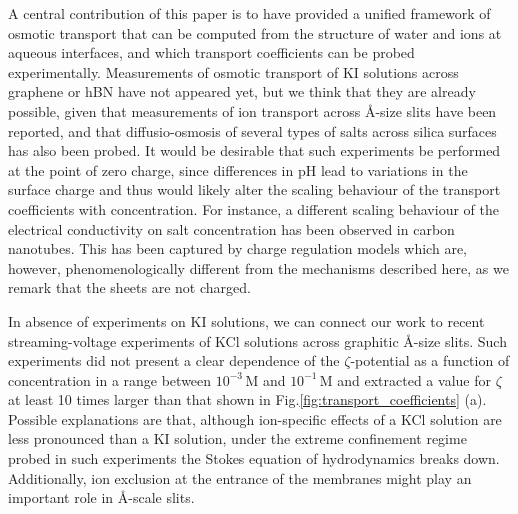\documentclass[journal=ancac3,manuscript=article,layout=twocolumn]{achemso}
\begin{document}
A central contribution of this paper is to have provided
a unified framework of osmotic transport that can be computed
from the structure of water and ions at aqueous interfaces,
and which transport coefficients can be probed experimentally. Measurements of osmotic transport of KI
solutions across graphene or hBN have not appeared yet, but
we think that they are already possible,
given that measurements of ion transport across
{\AA}-size slits have been reported,
and that diffusio-osmosis of several types of salts across
silica surfaces has also been probed.
It would be desirable that such experiments
be performed at the point of zero charge,
since differences in pH lead
to variations in the surface charge\cite{secchi2016scaling,Grosjean2019,Siria2013,Mouterde2018} and thus would likely alter the scaling behaviour
of the transport coefficients with concentration.
For instance,
a different scaling behaviour of the electrical
conductivity on salt concentration
has been observed in carbon nanotubes. This has been captured by
charge regulation models\cite{secchi2016scaling, biesheuvel2016analysis}
which are, however,
phenomenologically different
from the mechanisms described here, as we remark that
the sheets are not charged.

In absence of experiments on KI solutions,
we can connect our work to recent streaming-voltage experiments of KCl solutions across graphitic
\AA-size slits\cite{mouterde2019molecular}. Such experiments
did not present a clear dependence of the $\zeta$-potential
as a function of concentration
in a range between $ 10^{-3}$\,M and $10^{-1}$\,M
and extracted a value for $\zeta$ at least 10 times larger than that
shown in Fig.\ref{fig:transport_coefficients} (a).
Possible explanations are that, although ion-specific effects
of a KCl solution are less pronounced than a KI solution,
under the extreme confinement regime probed
in such experiments the Stokes equation of
hydrodynamics breaks down. Additionally,
ion exclusion at the entrance of the
membranes might play an important role in \AA-scale slits.
\end{document}
